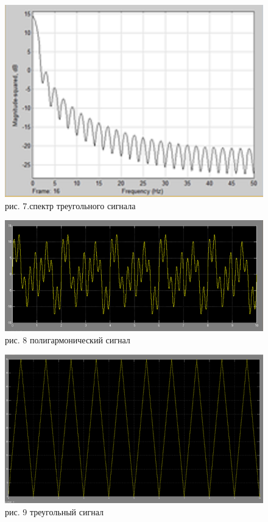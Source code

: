 \documentclass[10pt,a4paper]{report}
\begin{document}
\begin{figure}
\begin{center}
\includegraphics[angle=0, scale = 0.7]{7.png}\newline
рис. 7.спектр треугольного сигнала\newline
\end{center}
\end{figure}
\begin{figure}
\begin{center}
\includegraphics[angle=0, scale = 0.7]{8.png}\newline
рис. 8 полигармонический сигнал\newline
\end{center}
\end{figure}
\begin{figure}
\begin{center}
\includegraphics[angle=0, scale = 0.7]{9.png}\newline
рис. 9  треугольный сигнал\newline
\end{center}
\end{figure}
\end{document}
